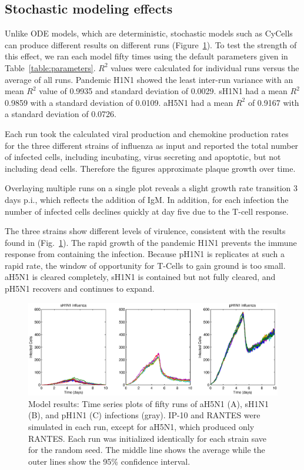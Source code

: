 \documentclass[10pt]{article}
\begin{document}
\subsection*{Stochastic modeling effects}

Unlike ODE models, which are deterministic, stochastic models such as CyCells can produce different results on different runs (Figure~\ref{fig:variance}).  To test the strength of this effect, we ran each model fifty times using the default parameters given in Table~\ref{table:parameters}.  $R^2$ values were calculated for individual runs versus the average of all runs.  Pandemic H1N1 showed the least inter-run variance with an mean $R^2$ value of 0.9935 and standard deviation of 0.0029.  sH1N1 had a mean $R^2$ 0.9859 with a standard deviation of 0.0109.  aH5N1 had a mean $R^2$ of 0.9167 with a standard deviation of 0.0726.  

Each run took the calculated viral production and chemokine production rates for the three different strains of influenza as input and reported the total number of infected cells, including incubating, virus secreting and apoptotic, but not including dead cells.  Therefore the figures approximate plaque growth over time.

Overlaying multiple runs on a single plot reveals a slight growth rate transition 3 days p.i., which reflects the addition of IgM.  In addition, for each infection the number of infected cells declines quickly at day five due to the T-cell response. 

The three strains show different levels of virulence, consistent with the results found in \cite{Mitchell2011} (Fig.~\ref{fig:variance}).  The rapid growth of the pandemic H1N1 prevents the immune response from containing the infection.  Because pH1N1 is replicates at such a rapid rate, the window of opportunity for T-Cells to gain ground is too small.  aH5N1 is cleared completely, sH1N1 is contained but not fully cleared, and pH5N1 recovers and continues to expand.

\begin{figure}[ht!]
\begin{center}
 \includegraphics[width=\textwidth]{variance}
 \end{center}
\caption{Model results: Time series plots of fifty runs of aH5N1 (A), sH1N1 (B), and pH1N1 (C) infections (gray). IP-10 and RANTES were simulated in each run, except for aH5N1, which  produced only RANTES.  Each run was initialized identically for each strain save for the random seed.  The middle line shows the average while the outer lines show the 95\% confidence interval.} 
 \label{fig:variance}
\end{figure}
\end{document}
